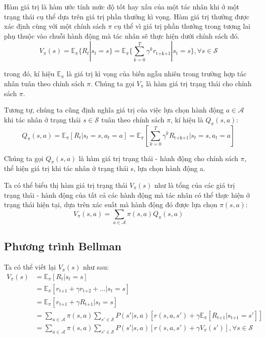 \documentclass{uetgraduation}
\begin{document}
Hàm giá trị là hàm ước tính mức độ tốt hay xấu của một tác nhân khi ở một trạng thái cụ thể dựa trên giá trị phần thưởng kì vọng. Hàm giá trị thường được xác định cùng với một chính sách $\pi$ cụ thể vì giá trị phần
thưởng trong tương lai phụ thuộc vào chuỗi hành động mà tác nhân sẽ thực hiện dưới chính sách đó.
\begin{equation}
    V_\pi (s) = \mathbb{E}_\pi \{R_t | s_t = s\} = \mathbb{E}_\pi \{\sum_{k=0}^{T} \gamma^k r_\text{t+k+1} | s_t = s\}, \forall s \in \mathcal{S}
    \label{eq:v_s}
\end{equation}

trong đó, kí hiệu $\mathbb{E}_\pi$ là giá trị kì vọng của biến ngẫu nhiên trong trường hợp tác nhân tuân theo chính sách $\pi$. Chúng ta gọi $V_\pi$ là hàm giá trị trạng thái cho chính sách $\pi$.

Tương tự, chúng ta cũng định nghĩa giá trị của việc lựa chọn hành động $a \in \mathcal{A}$ khi tác nhân ở trạng thái $s \in \mathcal{S}$ tuân theo chính sách $\pi$, kí hiệu là $Q_\pi (s, a)$:
\begin{equation}
    Q_\pi (s, a) = \mathbb{E}_\pi [R_t | s_t = s, a_t = a] = \mathbb{E}_\pi [\sum_{k=0}^{T} \gamma^k R_\text{t+k+1} | s_t = s, a_t = a]
    \label{eq:q_sa}
\end{equation}

Chúng ta gọi $Q_\pi (s, a)$ là hàm giá trị trạng thái - hành động cho chính sách $\pi$, thể hiện giá trị khi tác nhân ở trạng thái s, lựa chọn hành động a.

Ta có thể biểu thị hàm giá trị trạng thái $V_\pi (s)$ như là tổng của các giá trị trạng thái - hành động của tất cả các hành động mà tác nhân có thể thực hiện ở trạng thái hiện tại, dựa trên xác suất
mà hành động đó được lựa chọn $\pi(s, a)$:
\begin{equation}
    V_\pi (s, a) = \sum_{a \in \mathcal{A}} \pi(s, a) Q_\pi (s, a)
    \label{eq:relation_v_q}
\end{equation}

\subsection{Phương trình Bellman}
Ta có thể viết lại $V_\pi(s)$ như sau:
\begin{equation}
\begin{split}
    V_\pi(s) &= \mathbb{E}_\pi [R_t | s_t = s] \\
    &= \mathbb{E}_\pi [r_\text{t+1} + \gamma r_\text{t+2} + \dots | s_t = s] \\
    &= \mathbb{E}_\pi [r_\text{t+1} + \gamma R_\text{t+1} | s_t = s] \\
    &= \sum_{a \in \mathcal{A}} \pi (s, a) \sum_{s' \in \mathcal{S}} P(s' | s, a) [r(s, a, s') + \gamma \mathbb{E}_\pi [R_\text{t+1} | s_\text{t+1} = s']] \\
    &= \sum_{a \in \mathcal{A}} \pi (s, a) \sum_{s' \in \mathcal{S}} P(s' | s, a) [r(s, a, s') + \gamma V_\pi (s')], \forall s \in \mathcal{S}
\end{split}
\label{eq:v_bellman}
\end{equation}
\end{document}
